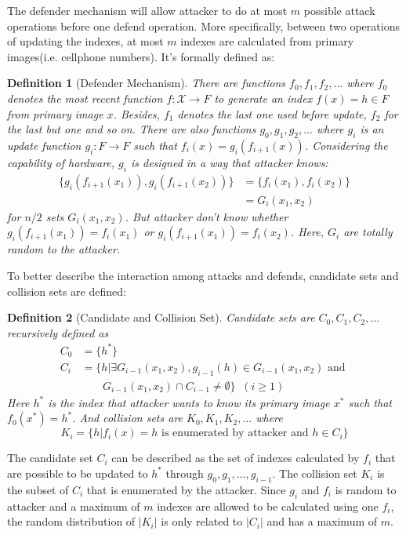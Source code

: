 \documentclass[10pt, conference, compsocconf]{IEEEtran}
\newtheorem{mydef}{Definition}
\begin{document}
		The defender mechanism will allow attacker to do at most $m$ possible
		attack operations before one defend operation. More specifically, between
		two operations of updating the indexes,
		at most $m$ indexes are calculated from primary images(i.e. cellphone numbers).
		It's formally defined as:
		\begin{mydef}[Defender Mechanism]
			There are functions $f_0, f_1, f_2, \ldots$ where
			$f_0$ denotes the most recent function $f: \mathcal{X} \rightarrow F$
			to generate an index $f(x) = h \in F$ from primary image $x$. 
			Besides, $f_1$ denotes the last one used before update, $f_2$ for the last but one and so on.
			There are also functions $g_0, g_1, g_2, \ldots$ where
			$g_i$ is an update function $g_i: F \rightarrow F$ such that
			$f_i(x) = g_i(f_{i+1}(x))$. Considering the capability of hardware,
			$g_i$ is designed in a way that attacker knows:
			\begin{align*}
				\{g_i(f_{i+1}(x_1)), g_i(f_{i+1}(x_2))\} &= \{ f_i(x_1), f_i(x_2)\}\\
					 &= G_i(x_1, x_2)
			\end{align*}
			for $n/2$ sets $G_i(x_1, x_2)$.
			But attacker don't know whether $g_i(f_{i+1}(x_1)) = f_i(x_1)$ or
			$g_i(f_{i+1}(x_1)) = f_i(x_2)$. 
			Here, $G_i$ are totally random
			to the attacker.
		\end{mydef}
		
		To better describe the interaction among attacks
		and defends, candidate sets and collision sets are defined:
		\begin{mydef}[Candidate and Collision Set]
			Candidate sets are $C_0, C_1, C_2, \ldots$ recursively defined as
			\begin{align*}
				C_0 &= \{h^*\}\\
				C_i &= \{h | \exists G_{i-1}(x_1, x_2),
					g_{i-1}(h) \in G_{i-1}(x_1, x_2) \text{ and } \\
					& \;\;\;\;\;\;\; G_{i-1}(x_1, x_2) \cap C_{i-1} \neq \emptyset \} \;\;(i \geq 1)
			\end{align*}
			Here $h^*$ is the index that attacker wants to know its primary image
			$x^*$ such that $f_0(x^*) = h^*$. And collision sets are $K_0, K_1, K_2, \ldots$ where
			\begin{equation*}
				K_i = \{h | f_i(x) = h \text{ is enumerated by attacker and } h \in C_i \}
			\end{equation*}
		\end{mydef}
		
		The candidate set $C_i$ can be described as the set of indexes 
		calculated by $f_i$ that are possible to be
		updated to $h^*$ through $g_0, g_1, \ldots, g_{i-1}$. The collision set $K_i$ is the
		subset of $C_i$ that is enumerated by the attacker. Since $g_i$ and $f_i$ is random
		to attacker and a maximum of $m$ indexes are allowed to be calculated using one $f_i$, 
		the random distribution of $|K_i|$ is only related to $|C_i|$ and has a maximum
		of $m$. 
		
\end{document}
